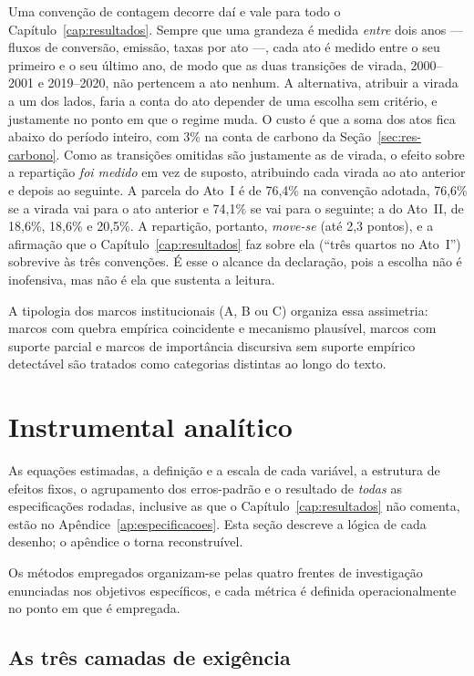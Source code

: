 Uma convenção de contagem decorre daí e vale para todo o Capítulo~\ref{cap:resultados}. Sempre que uma grandeza é medida \emph{entre} dois anos ---
fluxos de conversão, emissão, taxas por ato ---, cada ato é medido entre o seu
primeiro e o seu último ano, de modo que as duas transições de virada,
2000--2001 e 2019--2020, não pertencem a ato nenhum. A alternativa, atribuir a
virada a um dos lados, faria a conta do ato depender de uma escolha sem
critério, e justamente no ponto em que o regime muda. O custo é que a soma dos
atos fica abaixo do período inteiro, com 3\% na conta de carbono da
Seção~\ref{sec:res-carbono}. Como as transições omitidas são justamente as de
virada, o efeito sobre a repartição \emph{foi medido} em vez de suposto, atribuindo
cada virada ao ato anterior e depois ao seguinte. A parcela do Ato~I é de
76,4\% na convenção adotada, 76,6\% se a virada vai para o ato anterior e
74,1\% se vai para o seguinte; a do Ato~II, de 18,6\%, 18,6\% e 20,5\%. A
repartição, portanto, \emph{move-se} (até 2,3 pontos), e a afirmação que o
Capítulo~\ref{cap:resultados} faz sobre ela (``três quartos no Ato~I'')
sobrevive às três convenções. É esse o alcance da declaração, pois a escolha não é
inofensiva, mas não é ela que sustenta a leitura.

A tipologia dos marcos institucionais (A, B ou C) organiza essa assimetria:
marcos com quebra empírica coincidente e mecanismo plausível, marcos com
suporte parcial e marcos de importância discursiva sem suporte empírico
detectável são tratados como categorias distintas ao longo do texto.

\section{Instrumental analítico}
\label{sec:met-instrumental}

As equações estimadas, a definição e a escala de cada variável, a estrutura de
efeitos fixos, o agrupamento dos erros-padrão e o resultado de \emph{todas} as
especificações rodadas, inclusive as que o Capítulo~\ref{cap:resultados} não
comenta, estão no Apêndice~\ref{ap:especificacoes}. Esta seção descreve a lógica
de cada desenho; o apêndice o torna reconstruível.

Os métodos empregados organizam-se pelas quatro frentes de investigação
enunciadas nos objetivos específicos, e cada métrica é definida
operacionalmente no ponto em que é empregada.

\subsection{As três camadas de exigência}
\label{sec:met-camadas}

